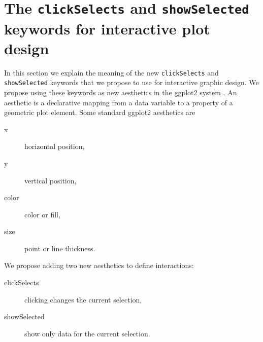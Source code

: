 \documentclass[journal]{vgtc}\usepackage[]{graphicx}\usepackage[]{color}
\begin{document}
\section{The \texttt{clickSelects} and \texttt{showSelected} keywords for interactive
  plot design}
\label{sec:design}




In this section we explain the meaning of the new
\texttt{clickSelects} and \texttt{showSelected} keywords that we
propose to use for interactive graphic design. We
propose using these keywords as new aesthetics in the ggplot2 system
\citep{ggplot2-book}. An aesthetic is a declarative mapping from a
data variable to a property of a geometric plot element. Some standard
ggplot2 aesthetics are
\begin{description}
\item[x] horizontal position,
\item[y] vertical position,
\item[color] color or fill,
\item[size] point or line thickness.
\end{description}
We propose adding two new aesthetics to define interactions:
\begin{description}
\item[clickSelects] clicking changes the current selection,
\item[showSelected] show only data for the current selection.
\end{description}
\end{document}

